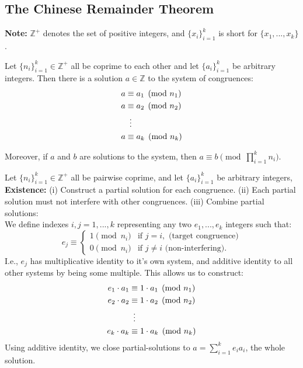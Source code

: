 

\subsection{The Chinese Remainder Theorem}

\begin{Note}
    \textbf{Note:} $\mathbb{Z}^+$ denotes the set of positive integers, and $\{x_i\}_{i=1}^k$ is short for $\{x_1,...,x_k\}$.
\end{Note}
\begin{theo}

    \label{theo:crt}

    Let $\{n_i\}_{i=1}^k\in\mathbb{Z}^+$ all be coprime to each other and let $\{a_i\}_{i=1}^k$ be arbitrary integers. Then there is a solution $a\in\mathbb{Z}$ to the system of congruences:
    \begin{align*}
        a &\equiv a_1 \pmod{n_1} \\
        a &\equiv a_2 \pmod{n_2} \\
        &\hspace*{.5em}\vdots \\
        a &\equiv a_k \pmod{n_k}
    \end{align*}
    
    
    \noindent
    Moreover, if $a$ and $b$ are solutions to the system, then $a\equiv b\pmod{\prod_{i=1}^k n_i}$.
\end{theo}
\begin{Proof}
Let $\{n_i\}_{i=1}^k\in\mathbb{Z}^+$ all be pairwise coprime, and let $\{a_i\}_{i=1}^k$ be arbitrary integers,\\

\noindent
\textbf{Existence:} (i) Construct a partial solution for each congruence. (ii) Each
partial solution must not interfere with other congruences. (iii) Combine partial solutions:\\

\noindent
We define indexes $i,j=1,...,k$ representing any two $e_1,...,e_k$ integers such that:
 \[e_j \equiv
 \begin{cases} 
 1 \pmod{n_i} & \text{if } j = i, \text{ (target congruence)}\\
 0 \pmod{n_i} & \text{if } j \neq i \text{ (non-interfering)}.
 \end{cases}
 \]
 I.e., $e_j$ has multiplicative identity to it's own system, and additive identity to all other systems
 by being some multiple. This allows us to construct:
 \begin{align*}
    e_1\cdot a_1 &\equiv 1\cdot a_1 \pmod{n_1} \\
    e_2\cdot a_2 &\equiv 1\cdot a_2 \pmod{n_2} \\
    &\hspace*{.5em}\vdots \\
    e_k\cdot a_k &\equiv 1\cdot a_k \pmod{n_k}
\end{align*}
Using additive identity, we close partial-solutions to $a = \sum_{i=1}^k e_ia_i$, the whole solution.
\end{Proof}

